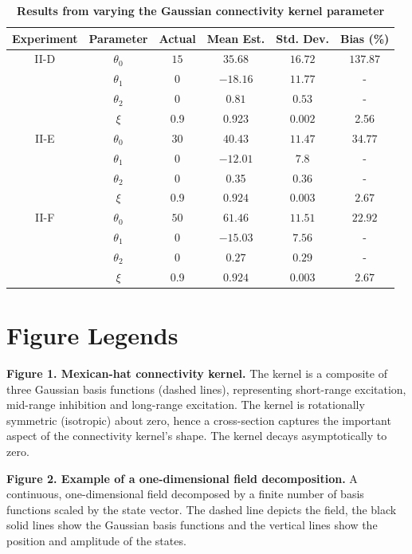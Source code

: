 \documentclass[review,authoryear,3p]{elsarticle}
\begin{document}
\clearpage
\newpage
\begin{table}[!ht]
\begin{tabular}{c|ccccc}
	Experiment & Parameter & Actual & Mean Est. & Std. Dev. & Bias (\%) \\ \hline
	II-D &$\theta_0$ & $15$ & $35.68$ & $16.72$ & $137.87$ \\
	& $\theta_1$ & 0 & $-18.16$ & $11.77$ & - \\
	& $\theta_2$ & 0 & $0.81$ & $0.53$ & - \\
	& $\xi$ & 0.9 & 0.923 & $0.002$ & 2.56 \\ \hline	
	
 	II-E& $\theta_0$ & $30$ & $40.43$ & $11.47$ & $34.77$ \\
	& $\theta_1$ & 0 & $-12.01$ & $7.8$ & - \\
	& $\theta_2$ & 0 & 0.35 & $0.36$ & - \\
	& $\xi$ & 0.9 & $0.924$ & $0.003$ & $2.67$ \\ \hline
	
	II-F & $\theta_0$ & $50$ & $61.46$ & $11.51$ & $22.92$ \\
	& $\theta_1$ & 0 & $-15.03$ & $7.56$ & - \\
	& $\theta_2$ & 0 & $0.27$ & $0.29$ & - \\
	& $\xi$ & 0.9 & $0.924$ & $0.003$ & $2.67$ \\ \hline
\end{tabular}
\caption{\textbf{Results from varying the Gaussian connectivity kernel parameter}}
\label{tab:GaussianKernelResults}
\end{table}

\doublespacing

\newpage
\clearpage
\section*{Figure Legends}
{\bf Figure 1. Mexican-hat connectivity kernel.} The kernel is a composite of three Gaussian basis functions (dashed lines), representing short-range excitation, mid-range inhibition and long-range excitation. The kernel is rotationally symmetric (isotropic) about zero, hence a cross-section captures the important aspect of the connectivity kernel's shape. The kernel decays asymptotically to zero.

{\bf Figure 2. Example of a one-dimensional field decomposition.} A continuous, one-dimensional field decomposed by a finite number of basis functions scaled by the state vector. The dashed line depicts the field, the black solid lines show the Gaussian basis functions and the vertical lines show the position and amplitude of the states.
\end{document}

